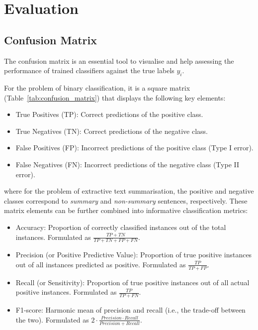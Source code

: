 \section{Evaluation}\label{sec:evaluation}

\subsection{Confusion Matrix}\label{subsec:confusion-matrix}
The confusion matrix is an essential tool to visualise and help assessing the performance of trained classifiers against the true labels $y_{i}$.

For the problem of binary classification, it is a square matrix (Table~\ref{tab:confusion_matrix}) that displays the following key elements:

\begin{itemize}
    \item True Positives (TP): Correct predictions of the positive class.
    \item True Negatives (TN): Correct predictions of the negative class.
    \item False Positives (FP): Incorrect predictions of the positive class (Type I error).
    \item False Negatives (FN): Incorrect predictions of the negative class (Type II error).
\end{itemize}

where for the problem of extractive text summarisation, the positive and negative classes correspond to \emph{summary} and \emph{non-summary} sentences, respectively.
These matrix elements can be further combined into informative classification metrics:

\begin{itemize}
    \item Accuracy: Proportion of correctly classified instances out of the total instances.
    Formulated as $\frac{TP + TN}{TP + TN + FP + FN}$.
    \item Precision (or Positive Predictive Value): Proportion of true positive instances out of all instances predicted as positive.
    Formulated as $\frac{TP}{TP + FP}$.
    \item Recall (or Sensitivity): Proportion of true positive instances out of all actual positive instances.
    Formulated as $\frac{TP}{TP + FN}$.
    \item F1-score: Harmonic mean of precision and recall (i.e., the trade-off between the two).
    Formulated as $2 \cdot \frac{Precision \cdot Recall}{Precision + Recall}$.
\end{itemize}



